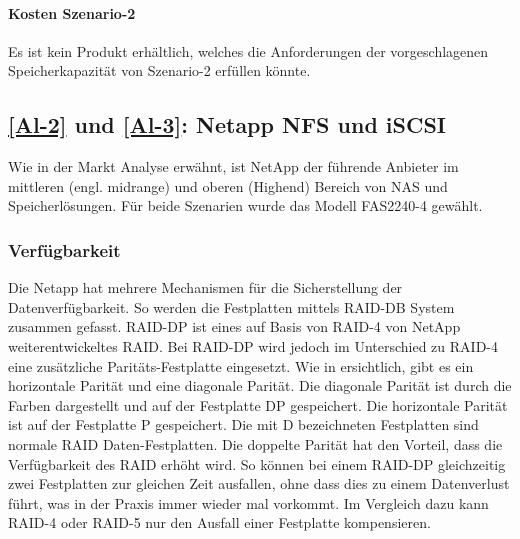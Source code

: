 \paragraph*{Kosten Szenario-2}
Es ist kein Produkt erhältlich, welches die Anforderungen der vorgeschlagenen Speicherkapazität von Szenario-2 erfüllen könnte.

\subsection{\ref{Al-2} und \ref{Al-3}: Netapp NFS und iSCSI}

Wie in der Markt Analyse erwähnt, ist NetApp der führende Anbieter im mittleren (engl. midrange) und oberen (Highend) Bereich von NAS und Speicherlösungen. Für beide Szenarien wurde das Modell FAS2240-4 gewählt. 

\subsubsection*{Verfügbarkeit}
Die Netapp hat mehrere Mechanismen für die Sicherstellung der Datenverfügbarkeit. So werden die Festplatten mittels RAID-DB System zusammen gefasst. RAID-DP ist eines auf Basis von RAID-4 von NetApp weiterentwickeltes RAID. Bei RAID-DP wird jedoch im Unterschied zu RAID-4 eine zusätzliche Paritäts-Festplatte eingesetzt. Wie in  ersichtlich, gibt es ein horizontale Parität und eine diagonale Parität. Die diagonale Parität ist durch die Farben dargestellt und auf der Festplatte DP gespeichert. Die horizontale Parität ist auf der Festplatte P gespeichert. Die mit D bezeichneten Festplatten sind normale RAID Daten-Festplatten. Die doppelte Parität hat den Vorteil, dass die Verfügbarkeit des RAID erhöht wird. So können bei einem RAID-DP gleichzeitig zwei Festplatten zur gleichen Zeit ausfallen, ohne dass dies zu einem Datenverlust führt, was in der Praxis immer wieder mal vorkommt. Im Vergleich dazu kann RAID-4 oder RAID-5 nur den Ausfall einer Festplatte kompensieren. \cite{White2010}

